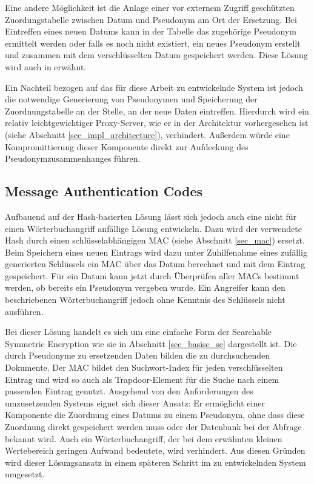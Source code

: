 Eine andere Möglichkeit ist die Anlage einer vor externem Zugriff geschützten Zuordungstabelle zwischen Datum und Pseudonym am Ort der Ersetzung. Bei Eintreffen eines neuen Datums kann in der Tabelle das zugehörige Pseudonym ermittelt werden oder falls es noch nicht existiert, ein neues Pseudonym erstellt und zusammen mit dem verschlüsselten Datum gespeichert werden. Diese Lösung wird auch in \cite{goh2003} erwähnt.

Ein Nachteil bezogen auf das für diese Arbeit zu entwickelnde System ist jedoch die notwendige Generierung von Pseudonymen und Speicherung der Zuordnungstabelle an der Stelle, an der neue Daten eintreffen. Hierdurch wird ein relativ leichtgewichtiger Proxy-Server, wie er in der Architektur vorhergesehen ist (siehe Abschnitt \ref{sec_impl_architecture}), verhindert. Außerdem würde eine Kompromittierung dieser Komponente direkt zur Aufdeckung des Pseudonymzusammenhanges führen. 

\subsection{Message Authentication Codes}

\label{sec_state_se_mac}

Aufbauend auf der Hash-basierten Lösung lässt sich jedoch auch eine nicht für einen Wörterbuchangriff anfällige Lösung entwickeln. Dazu wird der verwendete Hash durch einen schlüsselabhängigen MAC (siehe Abschnitt \ref{sec_mac}) ersetzt. Beim Speichern eines neuen Eintrags wird dazu unter Zuhilfenahme eines zufällig generierten Schlüssels ein MAC über das Datum berechnet und mit dem Eintrag gespeichert. Für ein Datum kann jetzt durch Überprüfen aller MACs bestimmt werden, ob bereits ein Pseudonym vergeben wurde. Ein Angreifer kann den beschriebenen Wörterbuchangriff jedoch ohne Kenntnis des Schlüssels nicht ausführen.

Bei dieser Lösung handelt es sich um eine einfache Form der Searchable Symmetric Encryption wie sie in Abschnitt \ref{sec_basisc_se} dargestellt ist. Die durch Pseudonyme zu ersetzenden Daten bilden die zu durchsuchenden Dokumente. Der MAC bildet den Suchwort-Index für jeden verschlüsselten Eintrag und wird so auch als Trapdoor-Element für die Suche nach einem passenden Eintrag genutzt. Ausgehend von den Anforderungen des umzusetzenden Systems eignet sich dieser Ansatz: Er ermöglicht einer Komponente die Zuordnung eines Datums zu einem Pseudonym, ohne dass diese Zuordnung direkt gespeichert werden muss oder der Datenbank bei der Abfrage bekannt wird. Auch ein Wörterbuchangriff, der bei dem erwähnten kleinen Wertebereich geringen Aufwand bedeutete, wird verhindert. Aus diesen Gründen wird dieser Lösungsansatz in einem späteren Schritt im zu entwickelnden System umgesetzt.

